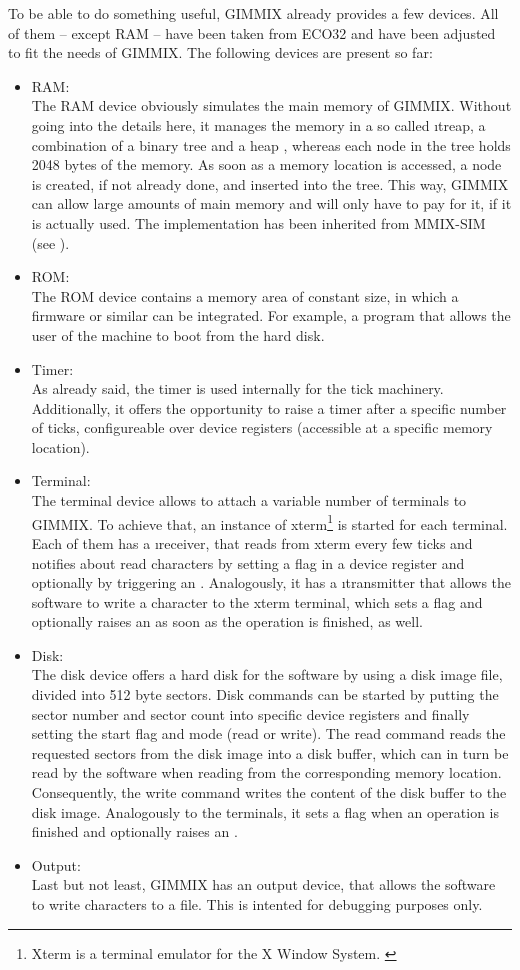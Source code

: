 To be able to do something useful, GIMMIX already provides a few devices. All of them -- except RAM -- have been taken from ECO32 and have been adjusted to fit the needs of GIMMIX. The following devices are present so far:
\begin{itemize}
	\item RAM:\\
	The RAM device obviously simulates the main memory of GIMMIX. Without going into the details here, it manages the memory in a so called \i{treap}, a combination of a binary tree and a heap \citep{treap}, whereas each node in the tree holds 2048 bytes of the memory. As soon as a memory location is accessed, a node is created, if not already done, and inserted into the tree. This way, GIMMIX can allow large amounts of main memory and will only have to pay for it, if it is actually used. The implementation has been inherited from MMIX-SIM (see \citep[pg. 12]{mmix-sim}).
	\item ROM:\\
	The ROM device contains a memory area of constant size, in which a firmware or similar can be integrated. For example, a program that allows the user of the machine to boot from the hard disk.
	\item Timer:\\
	As already said, the timer is used internally for the tick machinery. Additionally, it offers the opportunity to raise a timer  after a specific number of ticks, configureable over device registers (accessible at a specific memory location).
	\item Terminal:\\
	The terminal device allows to attach a variable number of terminals to GIMMIX. To achieve that, an instance of xterm\footnote{Xterm is a terminal emulator for the X Window System. \citep{glxterm}} is started for each terminal. Each of them has a \i{receiver}, that reads from xterm every few ticks and notifies about read characters by setting a flag in a device register and optionally by triggering an . Analogously, it has a \i{transmitter} that allows the software to write a character to the xterm terminal, which sets a flag and optionally raises an  as soon as the operation is finished, as well.
	\item Disk:\\
	The disk device offers a hard disk for the software by using a disk image file, divided into 512 byte sectors. Disk commands can be started by putting the sector number and sector count into specific device registers and finally setting the start flag and mode (read or write). The read command reads the requested sectors from the disk image into a disk buffer, which can in turn be read by the software when reading from the corresponding memory location. Consequently, the write command writes the content of the disk buffer to the disk image. Analogously to the terminals, it sets a flag when an operation is finished and optionally raises an .
	\item Output:\\
	Last but not least, GIMMIX has an output device, that allows the software to write characters to a file. This is intented for debugging purposes only.
\end{itemize}

